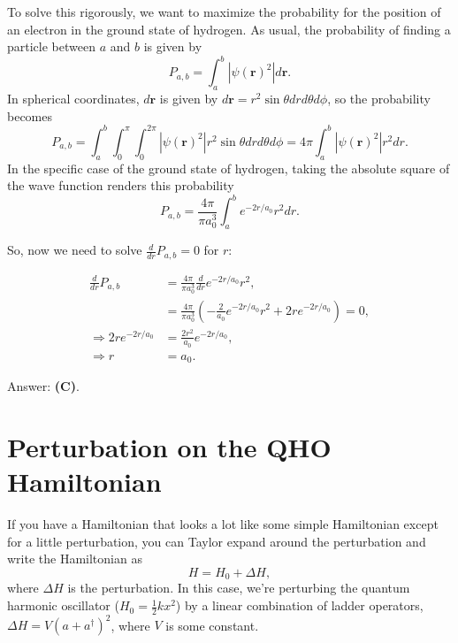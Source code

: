 \documentclass[11pt]{paper}
\newcommand{\answer}[1]{Answer: \textbf{(#1)}.}
\begin{document}
To solve this rigorously, we want to maximize the probability for the position of an electron in the ground state of hydrogen.  As usual, the probability of finding a particle between $a$ and $b$ is given by
\begin{equation}
	P_{a,b} = \int_a^b \left|\psi(\mathbf{r})^2\right|d\mathbf{r}.
\end{equation}
In spherical coordinates, $d\mathbf{r}$ is given by $d\mathbf{r} = r^2\sin\theta drd\theta d\phi$, so the probability becomes
\begin{equation}
	P_{a,b} = \int_a^b\int_0^\pi\int_0^{2\pi} \left|\psi(\mathbf{r})^2\right|r^2\sin\theta drd\theta d\phi = 4\pi\int_a^b\left|\psi(\mathbf{r})^2\right|r^2 dr.
\end{equation}
In the specific case of the ground state of hydrogen, taking the absolute square of the wave function renders this probability
\begin{equation}
	P_{a,b} = \frac{4\pi}{\pi a_0^3}\int_a^b e^{-2r/a_0}r^2 dr.
\end{equation}

So, now we need to solve $\frac{d}{dr}P_{a,b} = 0$ for $r$:

\begin{align}
	\frac{d}{dr}P_{a,b} &= \frac{4\pi}{\pi a_0^3}\frac{d}{dr} e^{-2r/a_0}r^2,\\
	&= \frac{4\pi}{\pi a_0^3}\left(-\frac{2}{a_0}e^{-2r/a_0}r^2 + 2re^{-2r/a_0}\right) = 0,\\
	\Rightarrow 2re^{-2r/a_0} &= \frac{2r^2}{a_0}e^{-2r/a_0},\\
	\Rightarrow r&=a_0.
\end{align}

\answer{C}

\section{Perturbation on the QHO Hamiltonian}

If you have a Hamiltonian that looks a lot like some simple Hamiltonian except for a little perturbation, you can Taylor expand around the perturbation and write the Hamiltonian as
\begin{equation}
	H = H_0 + \Delta H,
\end{equation}
where $\Delta H$ is the perturbation.  In this case, we're perturbing the quantum harmonic oscillator ($H_0 = \frac{1}{2}kx^2$) by a linear combination of ladder operators, $\Delta H = V\left(a + a^\dagger\right)^2$, where $V$ is some constant.
\end{document}
